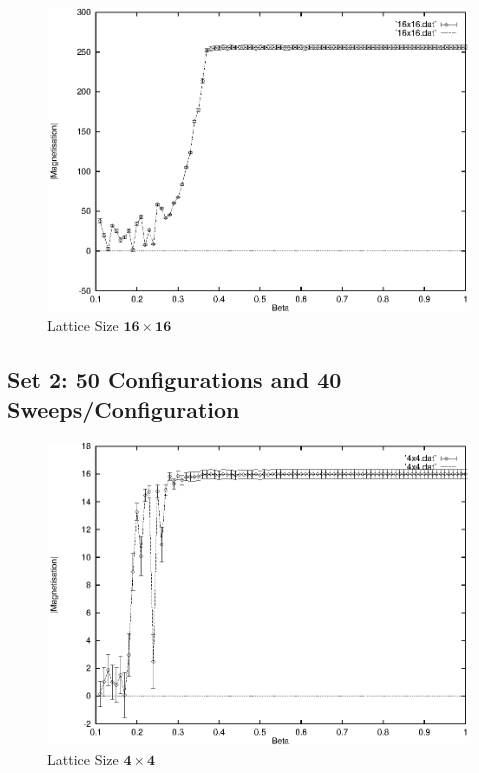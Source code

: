 \documentclass[a4paper]{IEEEtran}
\begin{document}
    \begin{figure} 
    \caption{Lattice Size $\mathbf{16 \times 16}$}
    \label{fig:16x16-1} 
    \begin{center}
        \includegraphics[width=0.99\columnwidth]{16x16_1.eps}
    \end{center}
    \end{figure} 


    \subsection{Set 2:  50 Configurations and 40 Sweeps/Configuration}
   
    \newpage
    \begin{figure}
    \caption{Lattice Size $\mathbf{4 \times 4}$}
    \label{fig:4x4-2} 
    \begin{center} 
        \includegraphics[width=0.99\columnwidth]{4x4_2.eps}
    \end{center}
    \end{figure} 
\end{document}
